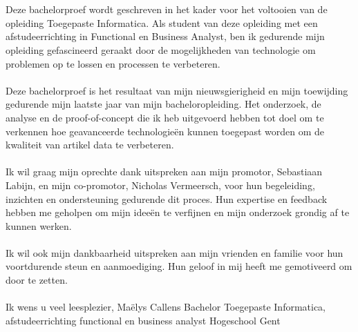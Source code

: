 
\chapter*{}%
\label{ch:voorwoord}


Deze bachelorproef wordt geschreven in het kader voor het voltooien van de opleiding Toegepaste Informatica. Als student van deze opleiding met een afstudeerrichting in Functional en Business Analyst, ben ik gedurende mijn opleiding gefascineerd geraakt door de mogelijkheden van technologie om problemen op te lossen en processen te verbeteren.
\\ \\
Deze bachelorproef is het resultaat van mijn nieuwsgierigheid en mijn toewijding gedurende mijn laatste jaar van mijn bacheloropleiding. Het onderzoek, de analyse en de proof-of-concept die ik heb uitgevoerd hebben tot doel om te verkennen hoe geavanceerde technologieën kunnen toegepast worden om de kwaliteit van artikel data te verbeteren.
\\ \\
Ik wil graag mijn oprechte dank uitspreken aan mijn promotor, Sebastiaan Labijn, en mijn co-promotor, Nicholas Vermeersch, voor hun begeleiding, inzichten en ondersteuning gedurende dit proces. Hun expertise en feedback hebben me geholpen om mijn ideeën te verfijnen en mijn onderzoek grondig af te kunnen werken.
\\ \\
Ik wil ook mijn dankbaarheid uitspreken aan mijn vrienden en familie voor hun voortdurende steun en aanmoediging. Hun geloof in mij heeft me gemotiveerd om door te zetten.
\\ \\ %
Ik wens u veel leesplezier,
\newline Maëlys Callens
\newline Bachelor Toegepaste Informatica, afstudeerrichting functional en business analyst
\newline Hogeschool Gent
